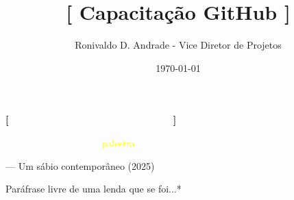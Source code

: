 \documentclass[10pt, brazil]{beamer}
\title{{\Huge \textcolor{lightpurple}{\textbf{[}} \textbf{Capacitação GitHub} \textcolor{lightpurple}{\textbf{]}}}}
\author{{\normalsize Ronivaldo D. Andrade - Vice Diretor de Projetos }}
\date{{\normalsize \today}}
\begin{document}
\begin{frame}[plain]{\textcolor{lightpurple}{\textbf{[}} \textbf{\textcolor{white}{Uma breve citação para começar}} \textcolor{lightpurple}{\textbf{]}}}

\vspace{3em}

\begin{center}
  \lexendlight
  \textcolor{white}{
    \Large
    “Isso aqui vai ser uma \textcolor{yellow}{palestra} de \textcolor{lightpurple}{GitHub intermediário}.”
  }

  \vspace{1em}

  \textcolor{lightpurple}{
    \small
    — Um sábio contemporâneo (2025)
  }
\end{center}

\vfill

\begin{flushright}
  \textcolor{lightpurple}{\scriptsize *Paráfrase livre de uma lenda que se foi...*}
\end{flushright}

\end{frame}
\end{document}
